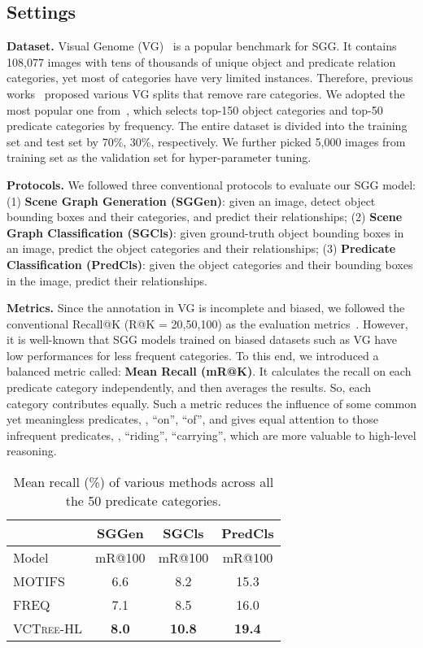 \documentclass[10pt,twocolumn,letterpaper]{article}
\begin{document}
\subsection{Settings}
\noindent\textbf{Dataset.}
Visual Genome (VG)~\cite{krishna2017visual} is a popular benchmark for SGG. It contains 108,077 images with tens of thousands of unique object and predicate relation categories, yet most of categories have very limited instances. Therefore, previous works~\cite{li2017scene,xu2017scene,zhang2017relationship} proposed various VG splits that remove rare categories. We adopted the most popular one from~\cite{xu2017scene}, which selects top-150 object categories and top-50 predicate categories by frequency. The entire dataset is divided into the training set and test set by 70\%, 30\%, respectively. We further picked 5,000 images from training set as the validation set for hyper-parameter tuning.

\noindent\textbf{Protocols.}
We followed three conventional protocols to evaluate our SGG model: (1) \textbf{Scene Graph Generation (SGGen)}: given an image, detect object bounding boxes and their categories, and predict their relationships; (2) \textbf{Scene Graph Classification (SGCls)}: given ground-truth object bounding boxes in an image, predict the object categories and their relationships; (3) \textbf{Predicate Classification (PredCls)}: given the object categories and their bounding boxes in the image, predict their relationships. 

\noindent\textbf{Metrics.}
Since the annotation in VG is incomplete and biased, we followed the conventional Recall@K (R@K = 20,50,100) as the evaluation metrics~\cite{lu2016visual,xu2017scene,zellers2017neural}. However, it is well-known that SGG models trained on biased datasets such as VG have low performances for less frequent categories. To this end, we introduced a balanced metric called: \textbf{Mean Recall (mR@K)}. It calculates the recall on each predicate category independently, and then averages the results. So, each category contributes equally. Such a metric reduces the influence of some common yet meaningless predicates, \eg, ``on'', ``of'', and gives equal attention to those infrequent predicates, \eg, ``riding'', ``carrying'', which are more valuable to high-level reasoning. 

\begin{table}
\centering
\scalebox{0.9}
{
\begin{tabular}{l c | c | c}
\hline
\multicolumn{1}{c}{} & \multicolumn{1}{c}{SGGen} & \multicolumn{1}{c}{SGCls} & \multicolumn{1}{c}{PredCls} \\
\hline
Model & mR@100 & mR@100 & mR@100 \\ 
\hline 
MOTIFS~\cite{zellers2017neural} & 6.6 & 8.2 & 15.3 \\
FREQ~\cite{zellers2017neural}  & 7.1 & 8.5 & 16.0 \\
\textsc{VCTree}-HL & \textbf{8.0} & \textbf{10.8} & \textbf{19.4} \\  
\hline
\hline
\end{tabular}
}
\caption{Mean recall (\%) of various methods across all the 50 predicate categories.}
\vspace{-0.1in}
\label{tab:2}
\end{table}
\end{document}

